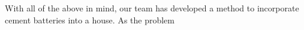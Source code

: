 With all of the above in mind, our team has developed a method to incorporate cement batteries into a house. As the problem 